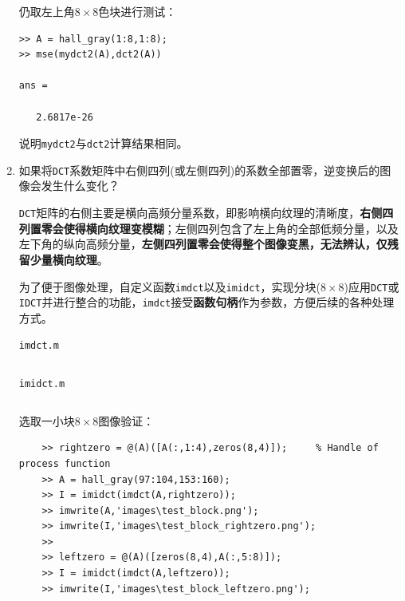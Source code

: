 \documentclass{article}
\numberwithin{figure}{section}
\numberwithin{table}{section}
\numberwithin{listing}{section}
\numberwithin{equation}{section}
\begin{document}
\begin{enumerate}
                仍取左上角$8\times 8$色块进行测试：
                \begin{verbatim}
>> A = hall_gray(1:8,1:8);
>> mse(mydct2(A),dct2(A))

ans =

   2.6817e-26
                \end{verbatim}

                说明\texttt{mydct2}与\texttt{dct2}计算结果相同。

            \item 如果将\texttt{DCT}系数矩阵中右侧四列(或左侧四列)的系数全部置零，逆变换后的图像会发生什么变化？

                \texttt{DCT}矩阵的右侧主要是横向高频分量系数，即影响横向纹理的清晰度，\textbf{右侧四列置零会使得横向纹理变模糊}；左侧四列包含了左上角的全部低频分量，以及左下角的纵向高频分量，\textbf{左侧四列置零会使得整个图像变黑，无法辨认，仅残留少量横向纹理}。

                为了便于图像处理，自定义函数\texttt{imdct}以及\texttt{imidct}，实现分块($8\times 8$)应用\texttt{DCT}或\texttt{IDCT}并进行整合的功能，\texttt{imdct}接受\textbf{函数句柄}作为参数，方便后续的各种处理方式。

                \begin{listing}[H]
                    \caption{\texttt{imdct.m}}
                    \label{code:imdct}
                    \inputminted{matlab}{../imdct.m}
                \end{listing}

                \begin{listing}[H]
                    \caption{\texttt{imidct.m}}
                    \label{code:imidct}
                    \inputminted{matlab}{../imidct.m}
                \end{listing}

                \newpage
                选取一小块$8\times 8$图像验证：
                \begin{verbatim}
    >> rightzero = @(A)([A(:,1:4),zeros(8,4)]);     % Handle of process function
    >> A = hall_gray(97:104,153:160);
    >> I = imidct(imdct(A,rightzero));
    >> imwrite(A,'images\test_block.png');
    >> imwrite(I,'images\test_block_rightzero.png');
    >>
    >> leftzero = @(A)([zeros(8,4),A(:,5:8)]);
    >> I = imidct(imdct(A,leftzero));
    >> imwrite(I,'images\test_block_leftzero.png');
                \end{verbatim}


\end{enumerate}
\end{document}
